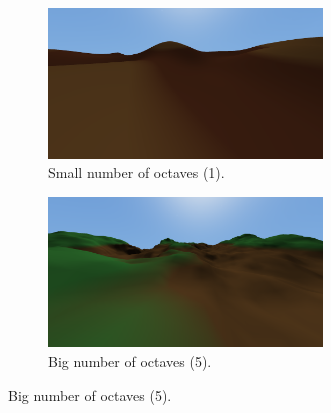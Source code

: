 \newpage
\begin{figure}[h]
    \centering
    \begin{subfigure}{0.45\textwidth}
        \centering
        \includegraphics[width=0.8\textwidth]{chapters/implementation/sections/terrain/resources/octaves-1.png}
        \caption{Small number of octaves (1).}
    \end{subfigure}
    \hfill
    \begin{subfigure}{0.45\textwidth}
        \centering
        \includegraphics[width=0.8\textwidth]{chapters/implementation/sections/terrain/resources/octaves-5.png}
        \caption{Big number of octaves (5).}
    \end{subfigure}


\end{figure}
